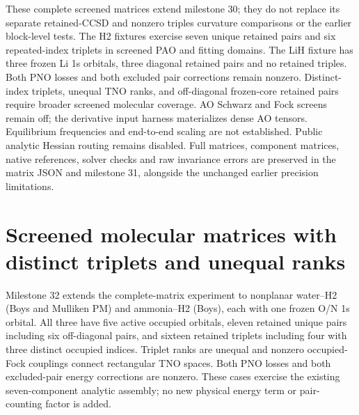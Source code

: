 \documentclass[11pt]{article}
\begin{document}
These complete screened matrices extend milestone 30; they do not replace
its separate retained-CCSD and nonzero triples curvature comparisons or
the earlier block-level tests. The H2 fixtures exercise seven unique
retained pairs and six repeated-index triplets in screened PAO and fitting
domains. The LiH fixture has three frozen Li 1s orbitals, three diagonal
retained pairs and no retained triples. Both PNO losses and both excluded
pair corrections remain nonzero. Distinct-index triplets, unequal TNO
ranks, and off-diagonal frozen-core retained pairs require broader screened
molecular coverage. AO Schwarz and Fock screens remain off; the derivative
input harness materializes dense AO tensors. Equilibrium frequencies and
end-to-end scaling are not established. Public analytic Hessian routing
remains disabled. Full matrices, component matrices, native references,
solver checks and raw invariance errors are preserved in the matrix JSON
and milestone 31, alongside the unchanged earlier precision limitations.

\section{Screened molecular matrices with distinct triplets and unequal ranks}
Milestone 32 extends the complete-matrix experiment to nonplanar water--H2
(Boys and Mulliken PM) and ammonia--H2 (Boys), each with one frozen O/N 1s
orbital. All three have five active occupied orbitals, eleven retained
unique pairs including six off-diagonal pairs, and sixteen retained
triplets including four with three distinct occupied indices. Triplet
ranks are unequal and nonzero occupied-Fock couplings connect rectangular
TNO spaces. Both PNO losses and both excluded-pair energy corrections are
nonzero. These cases exercise the existing seven-component analytic
assembly; no new physical energy term or pair-counting factor is added.
\end{document}
